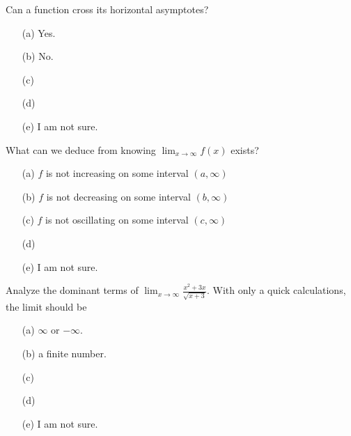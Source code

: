 \documentclass[14pt]{beamer}
\begin{document}
\begin{frame}
  Can a function cross its horizontal asymptotes?

  \medskip
  \begin{itemize} \setlength\itemsep{2ex}
    \item[(a)] Yes.
    \item[(b)] No.
    \item[(c)] 
    \item[(d)] 
    \item[(e)] I am not sure.
  \end{itemize} 
\end{frame}


\begin{frame}
  What can we deduce from knowing \(\lim_{x \to \infty} f(x)\) exists? 

  \medskip
  \begin{itemize} \setlength\itemsep{2ex}
    \item[(a)] \(f\) is not increasing on some interval \((a, \infty)\)
    \item[(b)] \(f\) is not decreasing on some interval \((b, \infty)\)
    \item[(c)] \(f\) is not oscillating on some interval \((c, \infty)\)
    \item[(d)] 
    \item[(e)] I am not sure.
  \end{itemize} 
\end{frame}


\begin{frame}
  Analyze the dominant terms of \(\lim_{x \to \infty} \frac{x^{2}+3x}{\sqrt{x+3}}\). With only a quick calculations, the limit should be

  \medskip
  \begin{itemize} \setlength\itemsep{2ex}
    \item[(a)] \(\infty\) or \(-\infty\).
    \item[(b)] a finite number.
    \item[(c)] 
    \item[(d)] 
    \item[(e)] I am not sure.
  \end{itemize} 
\end{frame}
\end{document}

